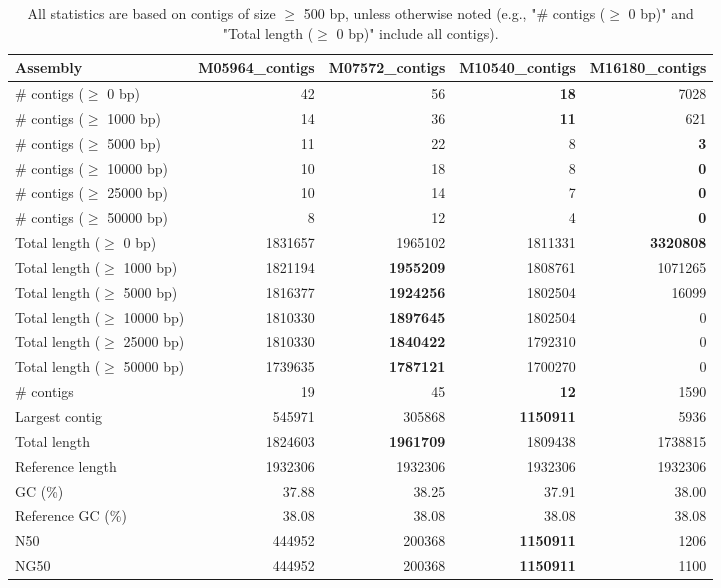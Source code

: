 \documentclass[12pt,a4paper]{article}
\begin{document}
\begin{table}[ht]
\begin{center}
\caption{All statistics are based on contigs of size $\geq$ 500 bp, unless otherwise noted (e.g., "\# contigs ($\geq$ 0 bp)" and "Total length ($\geq$ 0 bp)" include all contigs).}
\begin{tabular}{|l*{4}{|r}|}
\hline
Assembly & M05964\_contigs & M07572\_contigs & M10540\_contigs & M16180\_contigs \\ \hline
\# contigs ($\geq$ 0 bp) & 42 & 56 & {\bf 18} & 7028 \\ \hline
\# contigs ($\geq$ 1000 bp) & 14 & 36 & {\bf 11} & 621 \\ \hline
\# contigs ($\geq$ 5000 bp) & 11 & 22 & 8 & {\bf 3} \\ \hline
\# contigs ($\geq$ 10000 bp) & 10 & 18 & 8 & {\bf 0} \\ \hline
\# contigs ($\geq$ 25000 bp) & 10 & 14 & 7 & {\bf 0} \\ \hline
\# contigs ($\geq$ 50000 bp) & 8 & 12 & 4 & {\bf 0} \\ \hline
Total length ($\geq$ 0 bp) & 1831657 & 1965102 & 1811331 & {\bf 3320808} \\ \hline
Total length ($\geq$ 1000 bp) & 1821194 & {\bf 1955209} & 1808761 & 1071265 \\ \hline
Total length ($\geq$ 5000 bp) & 1816377 & {\bf 1924256} & 1802504 & 16099 \\ \hline
Total length ($\geq$ 10000 bp) & 1810330 & {\bf 1897645} & 1802504 & 0 \\ \hline
Total length ($\geq$ 25000 bp) & 1810330 & {\bf 1840422} & 1792310 & 0 \\ \hline
Total length ($\geq$ 50000 bp) & 1739635 & {\bf 1787121} & 1700270 & 0 \\ \hline
\# contigs & 19 & 45 & {\bf 12} & 1590 \\ \hline
Largest contig & 545971 & 305868 & {\bf 1150911} & 5936 \\ \hline
Total length & 1824603 & {\bf 1961709} & 1809438 & 1738815 \\ \hline
Reference length & 1932306 & 1932306 & 1932306 & 1932306 \\ \hline
GC (\%) & 37.88 & 38.25 & 37.91 & 38.00 \\ \hline
Reference GC (\%) & 38.08 & 38.08 & 38.08 & 38.08 \\ \hline
N50 & 444952 & 200368 & {\bf 1150911} & 1206 \\ \hline
NG50 & 444952 & 200368 & {\bf 1150911} & 1100 \\ \hline

\end{tabular}
\end{center}
\end{table}
\end{document}
